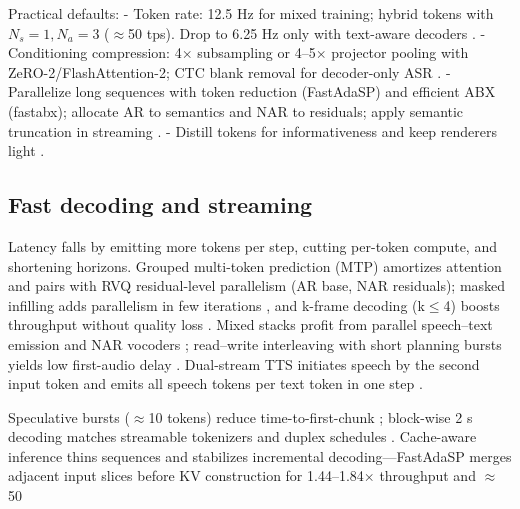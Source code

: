 \documentclass{article}
\begin{document}
Practical defaults:
- Token rate: 12.5 Hz for mixed training; hybrid tokens with $N_{s}=1, N_{a}=3$ ($\approx$50 tps). Drop to 6.25 Hz only with text-aware decoders \cite{yang2025diffsoundstreamefficientspeechtokenizati,wang2025tadicodectextawarediffusionspeechtokeniz}.
- Conditioning compression: 4$\times$ subsampling or 4--5$\times$ projector pooling with ZeRO-2/FlashAttention-2; CTC blank removal for decoder-only ASR \cite{wang2023slmbridgethingapbetweenspeechtextfoundat,nguyen2025qwenvsgemmaintegrationwhispercomparative,tsunoo2024decoderonlyarchitecturespeechrecognition}.
- Parallelize long sequences with token reduction (FastAdaSP) and efficient ABX (fastabx); allocate AR to semantics and NAR to residuals; apply semantic truncation in streaming \cite{lu2024fastadaspmultitaskadaptedefficientinfere,poli2025fastabxlibraryefficientcomputationabxdis}.
- Distill tokens for informativeness and keep renderers light \cite{ahasan2025dmcodecdistillingmultimodalrepresentatio,wang2025tadicodectextawarediffusionspeechtokeniz}.

\subsection{Fast decoding and streaming} \label{subsec:Fast decoding and streaming}
Latency falls by emitting more tokens per step, cutting per-token compute, and shortening horizons. Grouped multi-token prediction (MTP) amortizes attention and pairs with RVQ residual-level parallelism (AR base, NAR residuals); masked infilling adds parallelism in few iterations \cite{li2024masksrmaskedlanguagemodelfullbandspeechr}, and k-frame decoding (k$\le$4) boosts throughput without quality loss \cite{bai2025dmelspeechtokenizationmadesimple}. Mixed stacks profit from parallel speech--text emission and NAR vocoders \cite{tan2025drvoiceparallelspeechtextvoiceconversati}; read--write interleaving with short planning bursts yields low first-audio delay \cite{fang2025llamaomni2llmbasedrealtimespokenchatbota}. Dual-stream TTS initiates speech by the second input token and emits all speech tokens per text token in one step \cite{sheng2025syncspeechlowlatencyefficientdualstreamt}.

Speculative bursts ($\approx$10 tokens) reduce time-to-first-chunk \cite{long2025vitaaudiofastinterleavedcrossmodaltokeng}; block-wise 2 s decoding matches streamable tokenizers and duplex schedules \cite{zeng2024scalingspeechtextpretrainingsyntheticint}. Cache-aware inference thins sequences and stabilizes incremental decoding---FastAdaSP merges adjacent input slices before KV construction for 1.44--1.84$\times$ throughput and $\approx$50%
\end{document}
